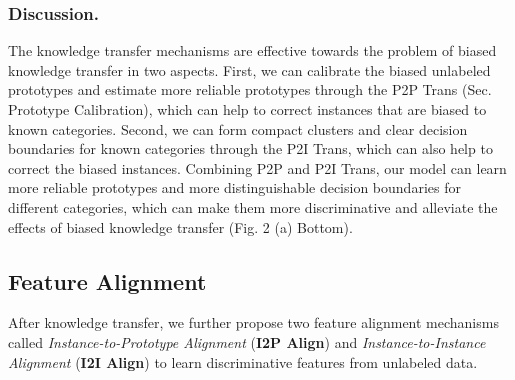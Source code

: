 \documentclass[letterpaper]{article} %
\begin{document}
\subsubsection{Discussion.} The knowledge transfer mechanisms are effective towards the problem of biased knowledge transfer in two aspects. First, we can calibrate the biased unlabeled prototypes and estimate more reliable prototypes through the P2P Trans (Sec. Prototype Calibration), which can help to correct instances that are biased to known categories. Second, we can form compact clusters and clear decision boundaries for known categories through the P2I Trans, which can also help to correct the biased instances.
Combining P2P and P2I Trans, our model can learn more reliable prototypes and more distinguishable decision boundaries for different categories, which can make them more discriminative and alleviate the effects of biased knowledge transfer (Fig. 2 (a) Bottom).






\subsection{Feature Alignment}
After knowledge transfer, we further propose two feature alignment mechanisms called \textit{Instance-to-Prototype Alignment} (\textbf{I2P Align}) and \textit{Instance-to-Instance Alignment} (\textbf{I2I Align}) to learn discriminative features from unlabeled data.
\end{document}
